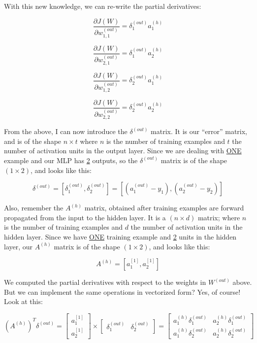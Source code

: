 \documentclass[12pt, letterpaper]{article}
\begin{document}
\vspace{5mm} %

With this new knowledge, we can re-write the partial derivatives:

\[
    \frac{\partial J(W)}{\partial w_{1,1}^{(out)}} =
    \delta_1^{(out)} a_1^{(h)}
\]

\[
    \frac{\partial J(W)}{\partial w_{2,1}^{(out)}} =
    \delta_1^{(out)} a_2^{(h)}
\]

\[
    \frac{\partial J(W)}{\partial w_{1,2}^{(out)}} =
    \delta_2^{(out)} a_1^{(h)}
\]

\[
    \frac{\partial J(W)}{\partial w_{2,2}^{(out)}} =
    \delta_2^{(out)} a_2^{(h)}
\]

From the above, I can now introduce the $\delta^{(out)}$ matrix.
It is our ``error'' matrix, and is of the shape $n \times t$ 
where $n$ is the number of training examples and $t$ the number 
of activation units in the output layer. Since we are dealing with
\underline{ONE} example and our MLP has \underline{2} outputs, so 
the $\delta^{(out)}$ matrix is of the shape $(1 \times 2)$, and 
looks like this:

\[
    \delta^{(out)} = [\delta_1^{(out)}, \delta_2^{(out)}] =
    [(a_{1}^{(out)} - y_1), (a_{2}^{(out)} - y_2)]
\]

\vspace{5mm} %

Also, remember the $A^{(h)}$ matrix, obtained after training
examples are forward propagated from the input to the hidden layer.
It is a $(n \times d)$ matrix; where $n$ is the number of training
examples and $d$ the number of activation units in the hidden layer.
Since we have \underline{ONE} training example and \underline{2}
units in the hidden layer, our $A^{(h)}$ matrix is of the shape
$(1 \times 2)$, and looks like this:

\[
    A^{(h)} = [a_1^{[1]}, a_2^{[1]}]
\]

We computed the partial derivatives with respect to the weights in
$W^{(out)}$ above. But we can implement the same operations in 
vectorized form? Yes, of course! Look at this:

\[
    (A^{(h)})^{T} \delta^{(out)}
    =
    \begin{bmatrix}
        a_1^{[1]} \\
        a_2^{[1]}
    \end{bmatrix}
    \times
    \begin{bmatrix}
        \delta_1^{(out)} & \delta_2^{(out)}
    \end{bmatrix}
    = 
    \begin{bmatrix}
        a_1^{(h)} \delta_1^{(out)} & a_2^{(h)} \delta_1^{(out)} \\
        a_1^{(h)} \delta_2^{(out)} & a_2^{(h)} \delta_2^{(out)}
    \end{bmatrix}
\]
\end{document}
